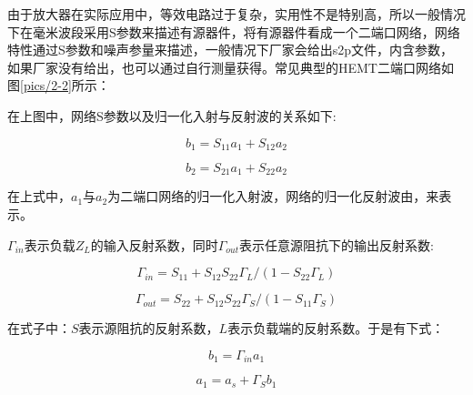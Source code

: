 由于放大器在实际应用中，等效电路过于复杂，实用性不是特别高，所以一般情况下在毫米波段采用S参数来描述有源器件，将有源器件看成一个二端口网络，网络特性通过S参数和噪声参量来描述，一般情况下厂家会给出s2p文件，内含参数，如果厂家没有给出，也可以通过自行测量获得。常见典型的HEMT二端口网络如图\ref{pics/2-2}所示：

在上图中，网络S参数以及归一化入射与反射波的关系如下: 

\begin{equation}%
b_1=S_{11}a_1+S_{12}a_2
\end{equation}

\begin{equation}%
b_2=S_{21}a_1+S_{22}a_2
\end{equation}

在上式中，$a_1$与$a_2$为二端口网络的归一化入射波，网络的归一化反射波由，来表示。

$\Gamma_{in}$表示负载$Z_L$的输入反射系数，同时$\Gamma_{out}$表示任意源阻抗下的输出反射系数:

\begin{equation}%
\Gamma_{in}=S_{11}+S_{12}S_{22}\Gamma_L / (1-S_{22}\Gamma_L)
\end{equation}

\begin{equation}%
\Gamma_{out}=S_{22}+S_{12}S_{22}\Gamma_S / (1-S_{11}\Gamma_S)
\end{equation}

在式子中：$S$表示源阻抗的反射系数，$L$表示负载端的反射系数。于是有下式：

\begin{equation}%
b_1=\Gamma_{in} a_1
\end{equation}

\begin{equation}%
a_1=a_s+\Gamma_S b_1
\end{equation}

